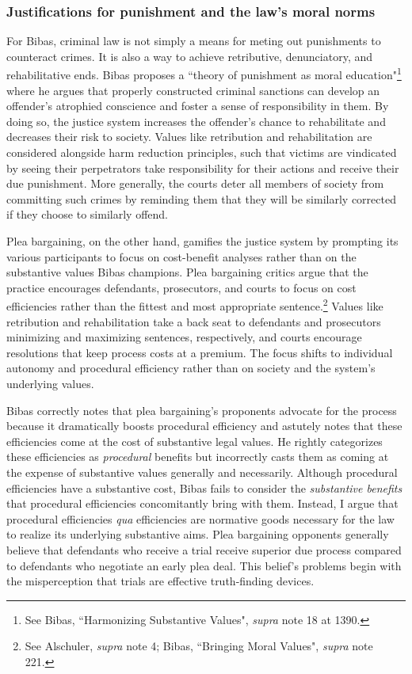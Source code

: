 \subsubsection{Justifications for punishment and the law's moral norms}

For Bibas, criminal law is not simply a means for meting out punishments to counteract crimes. It is also a way to achieve retributive, denunciatory, and rehabilitative ends. Bibas proposes a ``theory of punishment as moral education"\footnote{See Bibas, ``Harmonizing Substantive Values", \textit{supra} note 18 at 1390.} where he argues that properly constructed criminal sanctions can develop an offender's atrophied conscience and foster a sense of responsibility in them. By doing so, the justice system increases the offender's chance to rehabilitate and decreases their risk to society. Values like retribution and rehabilitation are considered alongside harm reduction principles, such that victims are vindicated by seeing their perpetrators take responsibility for their actions and receive their due punishment. More generally, the courts deter all members of society from committing such crimes by reminding them that they will be similarly corrected if they choose to similarly offend. 

Plea bargaining, on the other hand, gamifies the justice system by prompting its various participants to focus on cost-benefit analyses rather than on the substantive values Bibas champions. Plea bargaining critics argue that the practice encourages defendants, prosecutors, and courts to focus on cost efficiencies rather than the fittest and most appropriate sentence.\footnote{See Alschuler, \textit{supra} note 4; Bibas, ``Bringing Moral Values", \textit{supra} note 221.} Values like retribution and rehabilitation take a back seat to defendants and prosecutors minimizing and maximizing sentences, respectively, and courts encourage resolutions that keep process costs at a premium. The focus shifts to individual autonomy and procedural efficiency rather than on society and the system's underlying values.

Bibas correctly notes that plea bargaining's proponents advocate for the process because it dramatically boosts procedural efficiency and astutely notes that these efficiencies come at the cost of substantive legal values. He rightly categorizes these efficiencies as \textit{procedural} benefits but incorrectly casts them as coming at the expense of substantive values generally and necessarily. Although procedural efficiencies have a substantive cost, Bibas fails to consider the \textit{substantive benefits} that procedural efficiencies concomitantly bring with them. Instead, I argue that procedural efficiencies \textit{qua} efficiencies are normative goods necessary for the law to realize its underlying substantive aims. Plea bargaining opponents generally believe that defendants who receive a trial receive superior due process compared to defendants who negotiate an early plea deal. This belief's problems begin with the misperception that trials are effective truth-finding devices.

